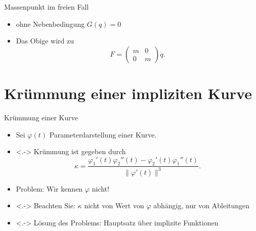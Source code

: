 \documentclass[aspectratio=169]{beamer}
\begin{document}
\begin{frame}{Massenpunkt im freien Fall}
\begin{itemize}
    \item ohne Nebenbedingung $G(q)=0$
    \item Das Obige wird zu
        \begin{equation*}
            F = \begin{pmatrix}
            m & 0 \\
            0 & m
            \end{pmatrix} \ddot{q}.
        \end{equation*}
\end{itemize}
\end{frame}

\section{Krümmung einer impliziten Kurve}

\begin{frame}{Krümmung einer Kurve}
\begin{itemize}[<+->]
    \item Sei $\varphi (t)$ Parameterdarstellung einer Kurve.
    \item<.-> Krümmung ist gegeben durch
        \begin{equation*}
        \kappa = \frac{\varphi_1'(t) \varphi_2''(t) - \varphi_2'(t) \varphi_1''(t)}{\| \varphi '(t) \|^3}.
        \end{equation*}
    \item Problem: Wir kennen $\varphi$ nicht!
    \item<.-> Beachten Sie: $\kappa$ nicht von Wert von $\varphi$ abhängig,
        nur von Ableitungen
    \item<.-> Lösung des Problems: Hauptsatz über implizite Funktionen
\end{itemize}
\end{frame}
\end{document}
